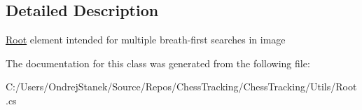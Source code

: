 \subsection{Detailed Description}
\mbox{\hyperlink{class_chess_tracking_1_1_utils_1_1_root}{Root}} element intended for multiple breath-\/first searches in image 



The documentation for this class was generated from the following file\+:\begin{DoxyCompactItemize}
\item 
C\+:/\+Users/\+Ondrej\+Stanek/\+Source/\+Repos/\+Chess\+Tracking/\+Chess\+Tracking/\+Utils/Root.\+cs\end{DoxyCompactItemize}
